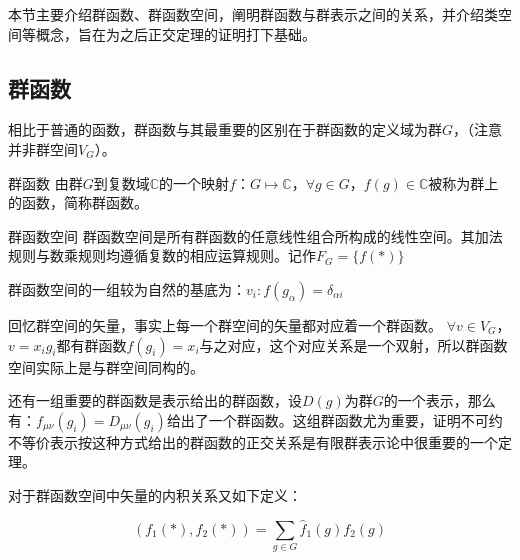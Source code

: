 
\begin{issues}
\issueDraft
\issueTODO
\end{issues}

本节主要介绍群函数、群函数空间，阐明群函数与群表示之间的关系，并介绍类空间等概念，旨在为之后正交定理的证明打下基础。

\subsection{群函数}

相比于普通的函数，群函数与其最重要的区别在于群函数的定义域为群$G$，（注意并非群空间$V_G$）。
\begin{definition}{群函数}
由群$G$到复数域$\mathbb{C}$的一个映射$f$：$G\longmapsto \mathbb{C}$，$\forall g\in G$，$f(g)\in \mathbb{C}$被称为群上的函数，简称群函数。
\end{definition}

\begin{definition}{群函数空间}
群函数空间是所有群函数的任意线性组合所构成的线性空间。其加法规则与数乘规则均遵循复数的相应运算规则。记作$F_G=\{f(*)\}$
\end{definition}

群函数空间的一组较为自然的基底为：$v_i:f(g_\alpha)=\delta_{\alpha i}$

回忆群空间的矢量，事实上每一个群空间的矢量都对应着一个群函数。
$\forall v\in V_G$，$v=x_ig_i$都有群函数$f(g_i)=x_i$与之对应，这个对应关系是一个双射，所以群函数空间实际上是与群空间同构的。

还有一组重要的群函数是表示给出的群函数，设$D(g)$为群$G$的一个表示，那么有：$f_{\mu\nu}(g_i)=D_{\mu\nu}(g_i)$给出了一个群函数。这组群函数尤为重要，证明不可约不等价表示按这种方式给出的群函数的正交关系是有限群表示论中很重要的一个定理。

对于群函数空间中矢量的内积关系又如下定义：

$$(f_1(*),f_2(*))=\displaystyle\sum_{g\in G} \hat f_1(g)f_2(g)$$
